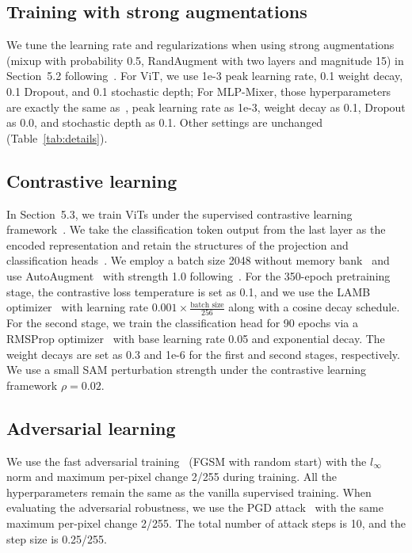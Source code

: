 \subsection{Training with strong augmentations}
We tune the learning rate and regularizations when using strong augmentations (mixup with probability 0.5, RandAugment with two layers and magnitude 15) in Section~5.2 following~\cite{tolstikhin2021mlpmixer}.
For ViT, we use 1e-3 peak learning rate, 0.1 weight decay, 0.1 Dropout, and 0.1 stochastic depth;
For MLP-Mixer, those hyperparameters are exactly the same as~\cite{tolstikhin2021mlpmixer}, peak learning rate as 1e-3, weight decay as 0.1, Dropout as 0.0, and stochastic depth as 0.1. Other settings are unchanged (Table~\ref{tab:details}).


\subsection{Contrastive learning}
In Section~5.3, we train ViTs under the supervised contrastive learning framework~\cite{khosla2020supcon}.
We take the classification token output from the last layer as the encoded representation and retain the structures of the projection and classification heads~\cite{khosla2020supcon}.
We employ a batch size 2048 without memory bank~\cite{He2020moco} and use AutoAugment~\cite{cubuk2019autoaugment} with strength 1.0 following~\cite{khosla2020supcon}.
For the 350-epoch pretraining stage, the contrastive loss temperature is set as 0.1,
and we use the LAMB optimizer~\cite{You2020Large} with learning rate $0.001\times \frac{\text{batch size}}{256}$ along with a cosine decay schedule.
For the second stage, we train the classification head for 90 epochs via a RMSProp optimizer~\cite{Tieleman2012rmsprop} with base learning rate 0.05 and exponential decay.
The weight decays are set as 0.3 and 1e-6 for the first and second stages, respectively.
We use a small SAM perturbation strength under the contrastive learning framework $\rho=0.02$.



\subsection{Adversarial learning}
We use the fast adversarial training~\cite{Wong2020Fast} (FGSM with random start) with the $l_\infty$ norm and maximum per-pixel change 2/255 during training. 
All the hyperparameters remain the same as the vanilla supervised training.
When evaluating the adversarial robustness, we use the PGD attack~\cite{madry2018towards} with the same maximum per-pixel change 2/255.
The total number of attack steps is 10, and the step size is 0.25/255.



